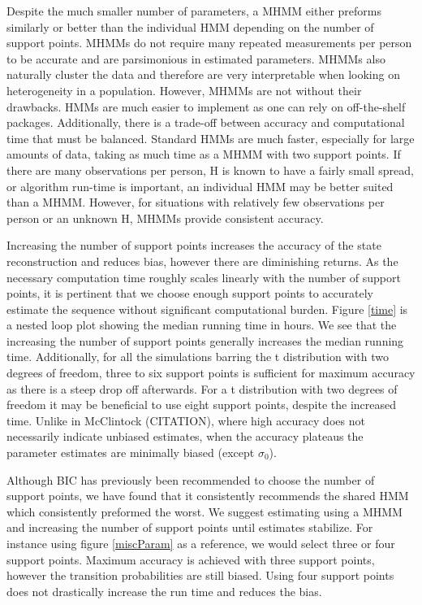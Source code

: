 \documentclass{article}
\begin{document}
Despite the much smaller number of parameters, a MHMM either preforms similarly or better than the individual HMM depending on the number of support points. MHMMs do not require many repeated measurements per person to be accurate and are parsimonious in estimated parameters. MHMMs also naturally cluster the data and therefore are very interpretable when looking on heterogeneity in a population. However, MHMMs are not without their drawbacks. HMMs are much easier to implement as one can rely on off-the-shelf packages. Additionally, there is a trade-off between accuracy and computational time that must be balanced. Standard HMMs are much faster, especially for large amounts of data, taking as much time as a MHMM with two support points. If there are many observations per person, H is known to have a fairly small spread, or algorithm run-time is important, an individual HMM may be better suited than a MHMM. However, for situations with relatively few observations per person or an unknown H, MHMMs provide consistent accuracy. 

Increasing the number of support points increases the accuracy of the state reconstruction and reduces bias, however there are diminishing returns. As the necessary computation time roughly scales linearly with the number of support points, it is pertinent that we choose enough support points to accurately estimate the sequence without significant computational burden. Figure \ref{time} is a nested loop plot showing the median running time in hours. We see that the increasing the number of support points generally increases the median running time. Additionally, for all the simulations barring the t distribution with two degrees of freedom, three to six support points is sufficient for maximum accuracy as there is a steep drop off afterwards. For a t distribution with two degrees of freedom it may be beneficial to use eight support points, despite the increased time. Unlike in McClintock (CITATION), where high accuracy does not necessarily indicate unbiased estimates, when the accuracy plateaus the parameter estimates are minimally biased (except $\sigma_0$).

Although BIC has previously been recommended to choose the number of support points, we have found that it consistently recommends the shared HMM which consistently preformed the worst. We suggest estimating using a MHMM and increasing the number of support points until estimates stabilize. For instance using figure \ref{miscParam} as a reference, we would select three or four support points. Maximum accuracy is achieved with three support points, however the transition probabilities are still biased. Using four support points does not drastically increase the run time and reduces the bias.
\end{document}
